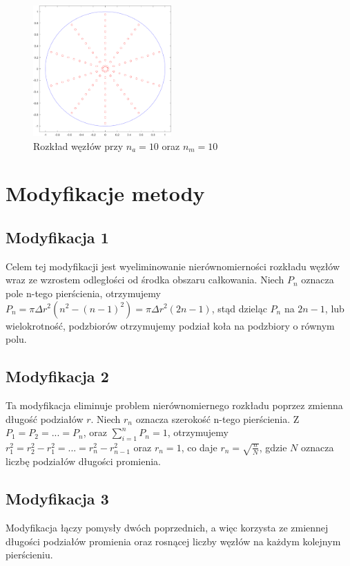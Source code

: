 \documentclass[a4paper,12pt]{article}
\begin{document}
\begin{figure}[h]
    \centering
    \includegraphics[height=5cm]{regular.png}
    \caption{Rozkład węzłów przy $n_a=10$ oraz $n_m=10$}
\end{figure}

\section*{Modyfikacje metody}
\subsection*{Modyfikacja 1}
    Celem tej modyfikacji jest wyeliminowanie nierównomierności rozkładu węzłów wraz ze wzrostem odległości od środka obszaru całkowania.
    Niech $P_n$ oznacza pole n-tego pierścienia, otrzymujemy $P_n=\pi\Delta r^2(n^2-(n-1)^2)=\pi\Delta r^2(2n-1)$, stąd dzieląc $P_n$ na $2n-1$, lub wielokrotność, podzbiorów otrzymujemy podział koła na podzbiory o równym polu.
    
\subsection*{Modyfikacja 2}
    Ta modyfikacja eliminuje problem nierównomiernego rozkładu poprzez zmienna długość podziałów $r$.
    Niech $r_n$ oznacza szerokość n-tego pierścienia.
    Z $P_1=P_2=...=P_n$, oraz $\sum\limits_{i=1}^n{P_n}=1$, otrzymujemy $r_1^2=r_2^2-r_1^2=...=r_n^2-r_{n-1}^2$ oraz $r_n=1$, co daje $r_n=\sqrt{\frac{n}{N}}$, gdzie $N$ oznacza liczbę podziałów długości promienia.
    
\subsection*{Modyfikacja 3}
    Modyfikacja łączy pomysły dwóch poprzednich, a więc korzysta ze zmiennej długości podziałów promienia oraz rosnącej liczby węzłów na każdym kolejnym pierścieniu.
    
\end{document}
